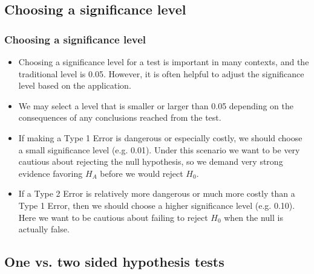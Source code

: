 
\subsection{Choosing a significance level}


\begin{frame}
\frametitle{Choosing a significance level}

\begin{itemize}

\item Choosing a significance level for a test is important in many contexts, and the traditional level is 0.05. However, it is often helpful to adjust the significance level based on the application. 

\item We may select a level that is smaller or larger than 0.05 depending on the consequences of any conclusions reached from the test.

\item If making a Type 1 Error is dangerous or especially costly, we should choose a small significance level (e.g. 0.01). Under this scenario we want to be very cautious about rejecting the null hypothesis, so we demand very strong evidence favoring $H_A$ before we would reject $H_0$.

\item If a Type 2 Error is relatively more dangerous or much more costly than a Type 1 Error, then we should choose a higher significance level (e.g. 0.10). Here we want to be cautious about failing to reject $H_0$ when the null is actually false.

\end{itemize}

\end{frame}

 
\subsection{One vs. two sided hypothesis tests}
 
 
